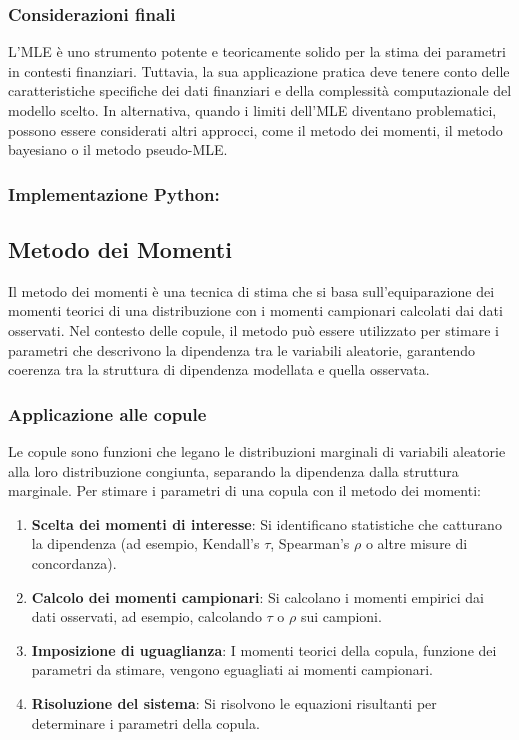 \documentclass[%
	corpo=11pt,
    twoside,
    stile=classica,
    oldstyle,
    tipotesi=custom,
    greek,
    evenboxes,
]{toptesi}
\begin{document}
\subsubsection{Considerazioni finali}

L'MLE è uno strumento potente e teoricamente solido per la stima dei parametri in contesti finanziari. Tuttavia, la sua applicazione pratica deve tenere conto delle caratteristiche specifiche dei dati finanziari e della complessità computazionale del modello scelto. In alternativa, quando i limiti dell'MLE diventano problematici, possono essere considerati altri approcci, come il metodo dei momenti, il metodo bayesiano o il metodo pseudo-MLE.\\

\subsubsection{Implementazione Python:}
\newpage
\subsection{Metodo dei Momenti}

Il metodo dei momenti è una tecnica di stima che si basa sull’equiparazione dei momenti teorici di una distribuzione con i momenti campionari calcolati dai dati osservati. Nel contesto delle copule, il metodo può essere utilizzato per stimare i parametri che descrivono la dipendenza tra le variabili aleatorie, garantendo coerenza tra la struttura di dipendenza modellata e quella osservata.

\subsubsection{Applicazione alle copule}

Le copule sono funzioni che legano le distribuzioni marginali di variabili aleatorie alla loro distribuzione congiunta, separando la dipendenza dalla struttura marginale. Per stimare i parametri di una copula con il metodo dei momenti:

\begin{enumerate}
	\item \textbf{Scelta dei momenti di interesse}: Si identificano statistiche che catturano la dipendenza (ad esempio, Kendall’s \( \tau \), Spearman’s \( \rho \) o altre misure di concordanza).
	\item \textbf{Calcolo dei momenti campionari}: Si calcolano i momenti empirici dai dati osservati, ad esempio, calcolando \( \tau \) o \( \rho \) sui campioni.
	\item \textbf{Imposizione di uguaglianza}: I momenti teorici della copula, funzione dei parametri da stimare, vengono eguagliati ai momenti campionari.
	\item \textbf{Risoluzione del sistema}: Si risolvono le equazioni risultanti per determinare i parametri della copula.
\end{enumerate}
\end{document}
